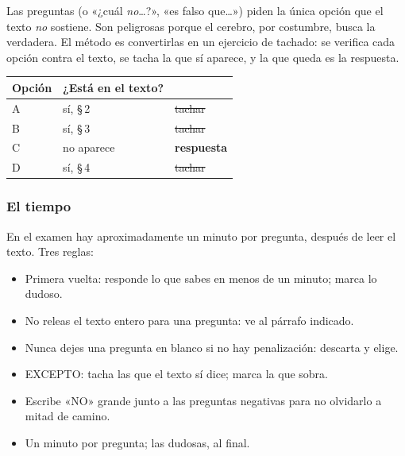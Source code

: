 \bitacora


Las preguntas  (o «¿cuál \emph{no}…?», «es falso que…») piden la única opción que el texto \emph{no}
sostiene. Son peligrosas porque el cerebro, por costumbre, busca la verdadera. El método es convertirlas en un ejercicio de
tachado: se verifica cada opción contra el texto, se tacha la que sí aparece, y la que queda es la respuesta.

\begin{center}\small
\begin{tabular}{@{}lll@{}}
\toprule
Opción & ¿Está en el texto? & \\\midrule
A & sí, \S\,2 & \sout{tachar}\\
B & sí, \S\,3 & \sout{tachar}\\
C & no aparece & \textbf{respuesta}\\
D & sí, \S\,4 & \sout{tachar}\\\bottomrule
\end{tabular}
\end{center}

\subsubsection{El tiempo}
En el examen hay aproximadamente un minuto por pregunta, después de leer el texto. Tres reglas:
\begin{itemize}
  \item Primera vuelta: responde lo que sabes en menos de un minuto; marca lo dudoso.
  \item No releas el texto entero para una pregunta: ve al párrafo indicado.
  \item Nunca dejes una pregunta en blanco si no hay penalización: descarta y elige.
\end{itemize}


\begin{regla}
\begin{itemize}
  \item EXCEPTO: tacha las que el texto sí dice; marca la que sobra.
  \item Escribe «NO» grande junto a las preguntas negativas para no olvidarlo a mitad de camino.
  \item Un minuto por pregunta; las dudosas, al final.
\end{itemize}
\end{regla}

